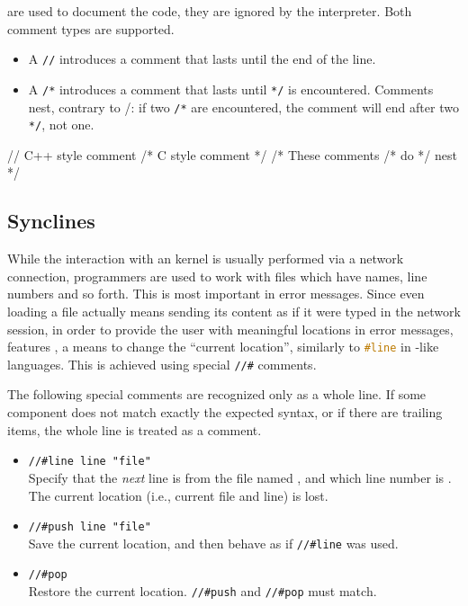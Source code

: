  are used to document the code, they are ignored by the
\us interpreter. Both \Cxx comment types are supported.

\begin{itemize}
\item A \lstinline|//| introduces a comment that lasts until the end
  of the line.
\item A \lstinline|/*| introduces a comment that lasts until
  \lstinline|*/| is encountered. Comments nest, contrary to \C/\Cxx:
  if two \lstinline|/*| are encountered, the
  comment will end after two \lstinline|*/|, not one.
\end{itemize}

\begin{urbiscript}
// C++ style comment
/* C style comment */
/* These comments /* do */ nest */
\end{urbiscript}

\subsection{Synclines}
\label{sec:specs:synclines}

While the interaction with an \us kernel is usually performed via a
network connection, programmers are used to work with files which have
names, line numbers and so forth.  This is most important in error
messages.  Since even loading a file actually means sending its
content as if it were typed in the network session, in order to
provide the user with meaningful locations in error messages, \us
features , a means to change the ``current
location'', similarly to \lstinline[language=C]|#line| in \C-like
languages.  This is achieved using special \lstinline|//#| comments.

The following special comments are recognized only as a whole line.
If some component does not match exactly the expected syntax, or if
there are trailing items, the whole line is treated as a comment.
\begin{itemize}
\item \lstinline|//#line line "file"|\\
  Specify that the \emph{next} line is from the file named ,
  and which line number is .  The current location (i.e.,
  current file and line) is lost.

\item \lstinline|//#push line "file"|\\
  Save the current location, and then behave as if \lstinline|//#line|
  was used.

\item \lstinline|//#pop|\\
  Restore the current location.  \lstinline|//#push| and
  \lstinline|//#pop| must match.
\end{itemize}


